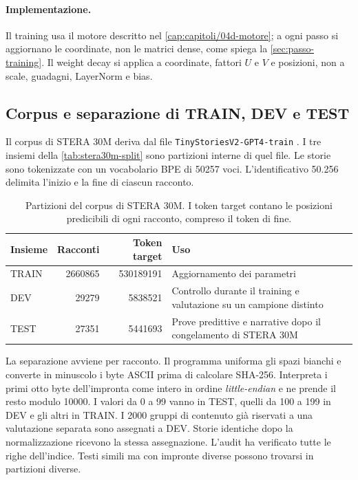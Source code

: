 \paragraph{Implementazione.} Il training usa il motore descritto nel \autoref{cap:capitoli/04d-motore}; a ogni passo si aggiornano le coordinate, non le matrici dense, come spiega la \autoref{sec:passo-training}. Il weight decay si applica a coordinate, fattori $U$ e $V$ e posizioni, non a scale, guadagni, LayerNorm e bias.

\subsection{Corpus e separazione di TRAIN, DEV e TEST}\label{sec:stera30m-dati}

Il corpus di STERA 30M deriva dal file \texttt{TinyStoriesV2-GPT4-train} \cite{eldan2023tinystories}. I tre insiemi della \autoref{tab:stera30m-split} sono partizioni interne di quel file. Le storie sono tokenizzate con un vocabolario BPE di \num{50257} voci. L'identificativo 50.256 delimita l'inizio e la fine di ciascun racconto.

\begin{table}[H]
\centering
\small
\begin{tabularx}{\linewidth}{lrrX}
\toprule
Insieme & Racconti & Token target & Uso \\
\midrule
TRAIN & \num{2660865} & \num{530189191} & Aggiornamento dei parametri \\
DEV & \num{29279} & \num{5838521} & Controllo durante il training e valutazione su un campione distinto \\
TEST & \num{27351} & \num{5441693} & Prove predittive e narrative dopo il congelamento di STERA 30M \\
\bottomrule
\end{tabularx}
\caption{Partizioni del corpus di STERA 30M. I token target contano le posizioni predicibili di ogni racconto, compreso il token di fine.}
\label{tab:stera30m-split}
\end{table}

La separazione avviene per racconto. Il programma uniforma gli spazi bianchi e converte in minuscolo i byte ASCII prima di calcolare SHA-256. Interpreta i primi otto byte dell'impronta come intero in ordine \emph{little-endian} e ne prende il resto modulo \num{10000}. I valori da 0 a 99 vanno in TEST, quelli da 100 a 199 in DEV e gli altri in TRAIN. I \num{2000} gruppi di contenuto già riservati a una valutazione separata sono assegnati a DEV. Storie identiche dopo la normalizzazione ricevono la stessa assegnazione. L'audit ha verificato tutte le righe dell'indice. Testi simili ma con impronte diverse possono trovarsi in partizioni diverse.

